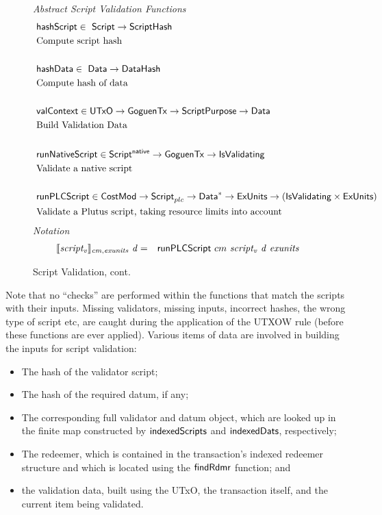 \begin{figure*}[htb]
  \emph{Abstract Script Validation Functions}
  \begin{align*}
     &\mathsf{hashScript} \in  ~\mathsf{Script}\to \mathsf{ScriptHash} \\
     &\text{Compute script hash} \\~\\
     &\mathsf{hashData} \in  ~\mathsf{Data} \to \mathsf{DataHash} \\
     &\text{Compute hash of data} \\~\\
     &\mathsf{valContext} \in  \mathsf{UTxO} \to \mathsf{GoguenTx} \to \mathsf{ScriptPurpose} \to \mathsf{Data} \\
     &\text{Build Validation Data} \\~\\
     &\mathsf{runNativeScript} \in\mathsf{Script^{native}} \to \mathsf{GoguenTx} \to \mathsf{IsValidating}  \\
     &\text{Validate a native script} \\~\\
     &\mathsf{runPLCScript} \in \mathsf{CostMod} \to\mathsf{Script}_{plc} \to
    \mathsf{Data}^{*} \to \mathsf{ExUnits} \to (\mathsf{IsValidating} \times \mathsf{ExUnits}) \\
     &\text{Validate a Plutus script, taking resource limits into account}
  \end{align*}
  \emph{Notation}
  \begin{align*}
    \llbracket \mathit{script_v} \rrbracket_{\mathit{cm},\mathit{exunits}}~\mathit{d}
    &=& \mathsf{runPLCScript} ~{cm}~\mathit{script_v}~\mathit{d}~\mathit{exunits}
  \end{align*}
  \caption{Script Validation, cont.}
  \label{fig:defs:functions-valid}
\end{figure*}

Note that no ``checks'' are performed within the functions that match the
scripts with their inputs. Missing validators, missing inputs, incorrect hashes, the wrong type of script etc,
are caught during the application of the UTXOW rule (before these functions are ever applied).
%
Various items of data are involved in building the inputs for script validation:

\begin{itemize}
\item The hash of the validator script;

\item The hash of the required datum, if any;

\item The corresponding full validator and datum object, which are looked up in the finite map
constructed by $\mathsf{indexedScripts}$ and $\mathsf{indexedDats}$, respectively;

\item The redeemer, which is contained in the transaction's indexed redeemer structure
and which is located using the $\mathsf{findRdmr}$ function; and

\item the validation data, built using the UTxO, the transaction itself,
and the current item being validated.
\end{itemize}


